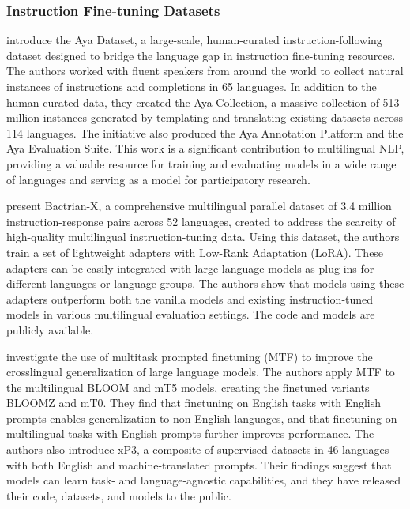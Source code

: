\documentclass[acmsmall]{acmart}
\begin{document}
\subsubsection{Instruction Fine-tuning Datasets }
\noindent

 \citep{singh2024ayadatasetopenaccesscollection} introduce the Aya Dataset, a large-scale, human-curated instruction-following dataset designed to bridge the language gap in instruction fine-tuning resources. The authors worked with fluent speakers from around the world to collect natural instances of instructions and completions in 65 languages. In addition to the human-curated data, they created the Aya Collection, a massive collection of 513 million instances generated by templating and translating existing datasets across 114 languages. The initiative also produced the Aya Annotation Platform and the Aya Evaluation Suite. This work is a significant contribution to multilingual NLP, providing a valuable resource for training and evaluating models in a wide range of languages and serving as a model for participatory research.
 
\citep{li2023bactrianxmultilingualreplicableinstructionfollowing} present Bactrian-X, a comprehensive multilingual parallel dataset of 3.4 million instruction-response pairs across 52 languages, created to address the scarcity of high-quality multilingual instruction-tuning data. Using this dataset, the authors train a set of lightweight adapters with Low-Rank Adaptation (LoRA). These adapters can be easily integrated with large language models as plug-ins for different languages or language groups. The authors show that models using these adapters outperform both the vanilla models and existing instruction-tuned models in various multilingual evaluation settings. The code and models are publicly available.

\citep{muennighoff2023crosslingualgeneralizationmultitaskfinetuning} investigate the use of multitask prompted finetuning (MTF) to improve the crosslingual generalization of large language models. The authors apply MTF to the multilingual BLOOM and mT5 models, creating the finetuned variants BLOOMZ and mT0. They find that finetuning on English tasks with English prompts enables generalization to non-English languages, and that finetuning on multilingual tasks with English prompts further improves performance. The authors also introduce xP3, a composite of supervised datasets in 46 languages with both English and machine-translated prompts. Their findings suggest that models can learn task- and language-agnostic capabilities, and they have released their code, datasets, and models to the public.
\end{document}
